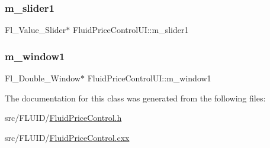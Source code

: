 \subsubsection{\texorpdfstring{m\+\_\+slider1}{m\_slider1}}
{\footnotesize\ttfamily Fl\+\_\+\+Value\+\_\+\+Slider$\ast$ Fluid\+Price\+Control\+U\+I\+::m\+\_\+slider1}

\mbox{\label{class_fluid_price_control_u_i_a65c8356043b3a182a177cf4a52317124}} 
\subsubsection{\texorpdfstring{m\+\_\+window1}{m\_window1}}
{\footnotesize\ttfamily Fl\+\_\+\+Double\+\_\+\+Window$\ast$ Fluid\+Price\+Control\+U\+I\+::m\+\_\+window1}



The documentation for this class was generated from the following files\+:\begin{DoxyCompactItemize}
\item 
src/\+F\+L\+U\+I\+D/\hyperlink{_fluid_price_control_8h}{Fluid\+Price\+Control.\+h}\item 
src/\+F\+L\+U\+I\+D/\hyperlink{_fluid_price_control_8cxx}{Fluid\+Price\+Control.\+cxx}\end{DoxyCompactItemize}
